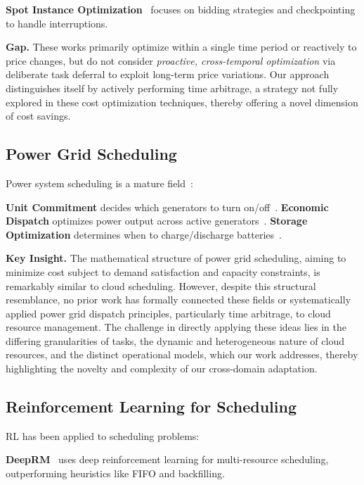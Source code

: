 \documentclass[10pt,conference]{IEEEtran}
\begin{document}
\textbf{Spot Instance Optimization}~\cite{wang2023spot,li2024bidding,zhang2025checkpointing} focuses on bidding strategies and checkpointing to handle interruptions.

\textbf{Gap.} These works primarily optimize within a single time period or reactively to price changes, but do not consider \textit{proactive, cross-temporal optimization} via deliberate task deferral to exploit long-term price variations. Our approach distinguishes itself by actively performing time arbitrage, a strategy not fully explored in these cost optimization techniques, thereby offering a novel dimension of cost savings.

\subsection{Power Grid Scheduling}

Power system scheduling is a mature field~\cite{wood2013power}:

\textbf{Unit Commitment} decides which generators to turn on/off~\cite{padhy2004unit}.
\textbf{Economic Dispatch} optimizes power output across active generators~\cite{zhu2015optimization}.
\textbf{Storage Optimization} determines when to charge/discharge batteries~\cite{luo2015overview}.

\textbf{Key Insight.} The mathematical structure of power grid scheduling, aiming to minimize cost subject to demand satisfaction and capacity constraints, is remarkably similar to cloud scheduling. However, despite this structural resemblance, no prior work has formally connected these fields or systematically applied power grid dispatch principles, particularly time arbitrage, to cloud resource management. The challenge in directly applying these ideas lies in the differing granularities of tasks, the dynamic and heterogeneous nature of cloud resources, and the distinct operational models, which our work addresses, thereby highlighting the novelty and complexity of our cross-domain adaptation.

\subsection{Reinforcement Learning for Scheduling}

RL has been applied to scheduling problems:

\textbf{DeepRM}~\cite{deeprm2017} uses deep reinforcement learning for multi-resource scheduling, outperforming heuristics like FIFO and backfilling.
\end{document}
